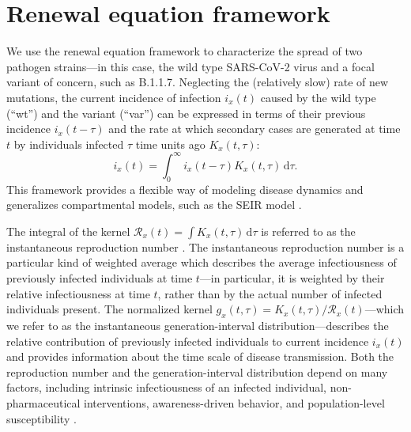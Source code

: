 \documentclass[12pt]{article}
\newcommand{\RR}{\ensuremath{{\mathcal R}}\xspace}
\newcommand{\dd}[1]{\ensuremath{\, \mathrm{d}#1}}
\newcommand{\dtau}{\dd{\tau}}
\begin{document}
\section{Renewal equation framework}

We use the renewal equation framework to characterize the spread of two pathogen strains---in this case, the wild type SARS-CoV-2 virus and a focal variant of concern, such as B.1.1.7.
Neglecting the (relatively slow) rate of new mutations, the current incidence of infection $i_x(t)$ caused by the wild type (``wt'') and the variant (``var'') can be expressed in terms of their previous incidence $i_x(t-\tau)$ and the rate at which secondary cases are generated at time $t$ by individuals infected $\tau$ time units ago $K_x(t, \tau)$:
\begin{equation}
i_x(t) = \int_0^\infty i_x(t-\tau) K_x(t, \tau) \dtau.
\end{equation}
This framework provides a flexible way of modeling disease dynamics and generalizes compartmental models, such as the SEIR model \citep{heesterbeek1996concept, diekmann2000mathematical, roberts2004modelling, aldis2005integral, roberts2007model, champredon2018equivalence}.

The integral of the kernel $\RR_x(t) = \int K_x(t, \tau) \dtau$ is referred to as the instantaneous reproduction number \citep{fraser2007estimating}.
The instantaneous reproduction number is a particular kind of weighted average which describes the average infectiousness of previously infected individuals at time $t$---in particular, it is weighted by their relative infectiousness at time $t$, rather than by the actual number of infected individuals present.
The normalized kernel $g_x(t, \tau) = K_x(t, \tau)/\RR_x(t)$---which we refer to as the instantaneous generation-interval distribution---describes the relative contribution of previously infected individuals to current incidence $i_x(t)$ and provides information about the time scale of disease transmission.
Both the reproduction number and the generation-interval distribution depend on many factors, including intrinsic infectiousness of an infected individual, non-pharmaceutical interventions, awareness-driven behavior, and population-level susceptibility \citep{fraser2007estimating}.
\end{document}
